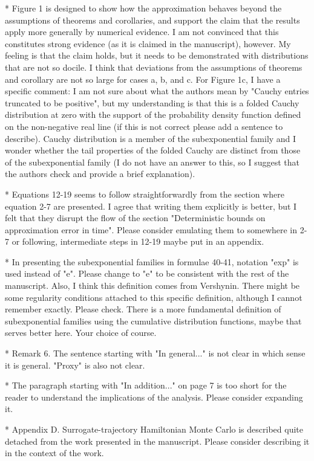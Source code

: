 \documentclass[12pt]{article}
\begin{document}
* Figure 1 is designed to show how the approximation behaves beyond the assumptions of theorems and corollaries, and support the claim that the results apply more generally by numerical evidence. I am not convinced that this constitutes strong evidence (as it is claimed in the manuscript), however. My feeling is that the claim holds, but it needs to be demonstrated with distributions that are not so docile. I think that deviations from the assumptions of theorems and corollary are not so large for cases a, b, and c. For Figure 1c, I have a specific comment: I am not sure about what the authors mean by "Cauchy entries truncated to be positive", but my understanding is that this is a folded Cauchy distribution at zero with the support of the probability density function defined on the non-negative real line (if this is not correct please add a sentence to describe). Cauchy distribution is a member of the subexponential family and I wonder whether the tail properties of the folded Cauchy are distinct from those of the subexponential family (I do not have an answer to this, so I suggest that the authors check and provide a brief explanation). 

* Equations 12-19 seems to follow straightforwardly from the section where equation 2-7 are presented. I agree that writing them explicitly is better, but I felt that they disrupt the flow of the section "Deterministic bounds on approximation error in time". Please consider emulating them to somewhere in 2-7 or following, intermediate steps in 12-19 maybe put in an appendix. 

* In presenting the subexponential families in formulae 40-41, notation "exp" is used instead of "e". Please change to "e" to be consistent with the rest of the manuscript. Also, I think this definition comes from Vershynin. There might be some regularity conditions attached to this specific definition, although I cannot remember exactly. Please check. There is a more fundamental definition of subexponential families using the cumulative distribution functions, maybe that serves better here. Your choice of course. 

* Remark 6. The sentence starting with "In general..." is not clear in which sense it is general. "Proxy" is also not clear. 

* The paragraph starting with "In addition..." on page 7 is too short for the reader to understand the implications of the analysis. Please consider expanding it. 

* Appendix D. Surrogate-trajectory Hamiltonian Monte Carlo is described quite detached from the work presented in the manuscript. Please consider describing it in the context of the work. 
\end{document}
